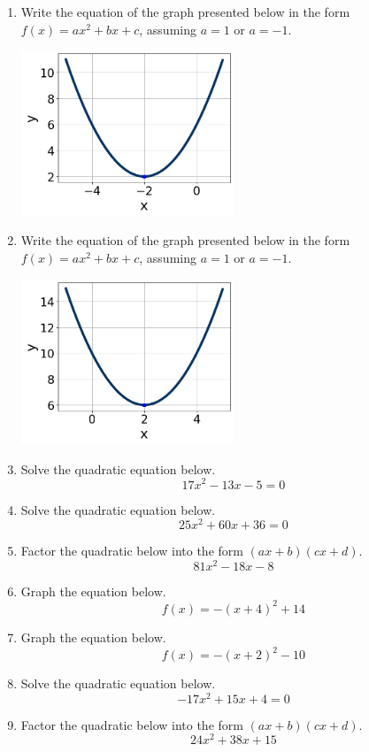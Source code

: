 \documentclass[14pt]{extbook}
\begin{document}
\begin{enumerate}
\item{
Write the equation of the graph presented below in the form $f(x)=ax^2+bx+c$, assuming  $a=1$ or $a=-1$.
\begin{center}
    \includegraphics[width=0.5\textwidth]{../Figures/quadraticGraphToEquationCopyA.png}
\end{center}
} \newpage
\item{
Write the equation of the graph presented below in the form $f(x)=ax^2+bx+c$, assuming  $a=1$ or $a=-1$.
\begin{center}
    \includegraphics[width=0.5\textwidth]{../Figures/quadraticGraphToEquationA.png}
\end{center}
} \newpage
\item{
Solve the quadratic equation below.\[ 17x^{2} -13 x -5 = 0 \]} \newpage
\item{
Solve the quadratic equation below.\[ 25x^{2} +60 x + 36 = 0 \]} \newpage
\item{
Factor the quadratic below into the form $(ax+b)(cx+d)$.\[ 81x^{2} -18 x -8 \]} \newpage
\item{
Graph the equation below.\[ f(x) = -(x+4)^2 + 14 \]} \newpage
\item{
Graph the equation below.\[ f(x) = -(x+2)^2 - 10 \]} \newpage
\item{
Solve the quadratic equation below.\[ -17x^{2} +15 x + 4 = 0 \]} \newpage
\item{
Factor the quadratic below into the form $(ax+b)(cx+d)$.\[ 24x^{2} +38 x + 15 \]} \newpage

\end{enumerate}
\end{document}
